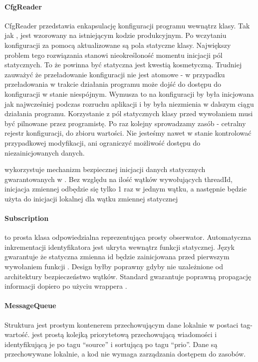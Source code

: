 \paragraph{CfgReader}
CfgReader przedstawia enkapsulację konfiguracji programu wewnątrz klasy.
Tak jak ,  jest wzorowany na istniejącym kodzie produkcyjnym. Po wczytaniu konfiguracji za pomocą  aktualizowane są pola statyczne klasy. Największy problem tego rozwiązania stanowi nieokreśloność momentu inicjacji pól statycznych. To że  powinna być statyczna jest kwestią kosmetyczną. Trudniej zauważyć że przeładowanie konfiguracji nie jest atomowe - w przypadku przeładowania w trakcie działania programu może dojść do dostępu do konfiguracji w stanie niespójnym. Wymusza to na konfiguracji by była inicjowana jak najwcześniej podczas rozruchu aplikacji i by była niezmienia w dalszym ciągu działania programu. Korzystanie z pól statycznych klasy przed wywołaniem  musi być pilnowane przez programistę. Po raz kolejny sprowadzamy zasób - cetralny rejestr konfiguracji, do zbioru wartości. Nie jesteśmy nawet w stanie kontrolować przypadkowej modyfikacji, ani ograniczyć możliwość dostępu do niezainicjowanych danych.

 wykorzystuje mechanizm bezpiecznej inicjacji danych statycznych gwarantowanych w . Bez względu na ilość wątków wywołujących threadId, inicjacja zmiennej  odbędzie się tylko 1 raz w jednym wątku, a następnie będzie użyta do inicjacji lokalnej dla wątku zmiennej statycznej 

\paragraph{Subscription}
 to prosta klasa odpowiedzialna reprezentująca prosty obserwator. Automatyczna inkrementacji identyfikatora jest ukryta wewnątrz funkcji statycznej. Język gwarantuje że statyczna zmienna id będzie zainicjowana przed pierwszym wywołaniem funkcji . Design byłby poprawny gdyby nie uzależnione od architektury bezpieczeństwo wątków. Standard gwarantuje poprawną propagację informacji dopiero po użyciu wrappera .

\paragraph{MessageQueue}
Struktura  jest prostym kontenerem przechowującym dane lokalnie w postaci tag-wartość.
 jest prostą kolejką priorytetową przechowującą wiadomości i identyfikującą je po tagu ``source'' i sortującą po tagu ``prio''. Dane są przechowywane lokalnie, a kod nie wymaga zarządzania dostępem do zasobów.

